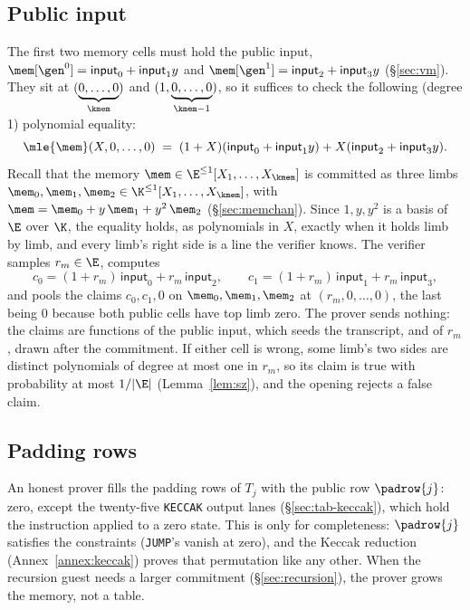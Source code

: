 \subsection{Public input}\label{sec:e2e-pi}

The first two memory cells must hold the public input, $\mem[\gen^{0}]=\textsf{input}_0+\textsf{input}_1y$ and $\mem[\gen^{1}]=\textsf{input}_2+\textsf{input}_3y$ (\S\ref{sec:vm}). They sit at $(\underbrace{0,\dots,0}_{\kmem})$ and $(1,\underbrace{0,\dots,0}_{\kmem-1})$, so it suffices to check the following (degree 1) polynomial equality:
\[
  \mle{\mem}(X,0,\dots,0)\;=\;(1+X)(\textsf{input}_0+\textsf{input}_1y)+X(\textsf{input}_2+\textsf{input}_3y).
\]
Recall that the memory $\mem\in\E^{\le1}[X_1,\dots,X_{\kmem}]$ is committed as three limbs $\mem_0,\mem_1,\mem_2\in\K^{\le1}[X_1,\dots,X_{\kmem}]$, with $\mem=\mem_0+y\,\mem_1+y^2\,\mem_2$ (\S\ref{sec:memchan}). Since $1,y,y^2$ is a basis of $\E$ over $\K$, the equality holds, as polynomials in $X$, exactly when it holds limb by limb, and every limb's right side is a line the verifier knows. The verifier samples $r_m\in\E$, computes
\[
  c_0=(1+r_m)\,\textsf{input}_0+r_m\,\textsf{input}_2,\qquad c_1=(1+r_m)\,\textsf{input}_1+r_m\,\textsf{input}_3,
\]
and pools the claims $c_0,c_1,0$ on $\mem_0,\mem_1,\mem_2$ at $(r_m,0,\dots,0)$, the last being $0$ because both public cells have top limb zero. The prover sends nothing: the claims are functions of the public input, which seeds the transcript, and of $r_m$, drawn after the commitment. If either cell is wrong, some limb's two sides are distinct polynomials of degree at most one in $r_m$, so its claim is true with probability at most $1/|\E|$ (Lemma~\ref{lem:sz}), and the opening rejects a false claim.

\subsection{Padding rows}\label{sec:e2e-pad}

An honest prover fills the padding rows of $T_j$ with the public row $\padrow{j}$: zero, except the twenty-five \texttt{KECCAK} output lanes (\S\ref{sec:tab-keccak}), which hold the instruction applied to a zero state. This is only for completeness: $\padrow{j}$ satisfies the constraints (\texttt{JUMP}'s vanish at zero), and the Keccak reduction (Annex~\ref{annex:keccak}) proves that permutation like any other. When the recursion guest needs a larger commitment (\S\ref{sec:recursion}), the prover grows the memory, not a table.

